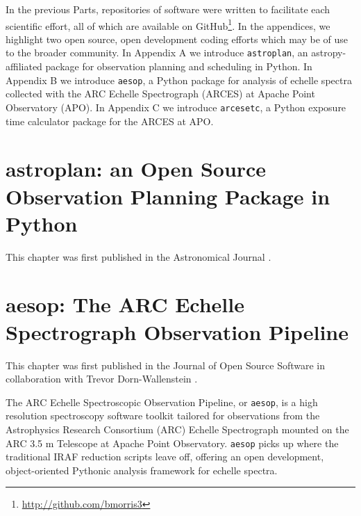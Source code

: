 \documentclass[12pt, twoside]{uwthesis}
\begin{document}


\printendnotes

%
%



%
%
\appendix
\raggedbottom\sloppy

\pagebreak
In the previous Parts, repositories of software were written to facilitate each scientific effort, all of which are available on GitHub\footnote{\url{http://github.com/bmorris3}}. In the appendices, we highlight two open source, open development coding efforts which may be of use to the broader community. In Appendix A we introduce {\tt astroplan}, an astropy-affiliated package for observation planning and scheduling in Python. In Appendix B we introduce {\tt aesop}, a Python package for analysis of echelle spectra collected with the ARC Echelle Spectrograph (ARCES) at Apache Point Observatory (APO). In Appendix C we introduce {\tt arcesetc}, a Python exposure time calculator package for the ARCES at APO.  

\chapter{astroplan: an Open Source Observation Planning Package in Python} \label{chap:astroplan}

This chapter was first published in the Astronomical Journal \citep{astroplan}.



\chapter{aesop: The ARC Echelle Spectrograph Observation Pipeline} \label{chap:aesop}

This chapter was first published in the Journal of Open Source Software in collaboration with Trevor Dorn-Wallenstein \citep{aesop}.

The ARC Echelle Spectroscopic Observation Pipeline, or {\tt aesop}, is a high resolution spectroscopy software toolkit tailored for observations from the Astrophysics Research Consortium (ARC) Echelle Spectrograph mounted on the ARC 3.5 m Telescope at Apache Point Observatory. {\tt aesop} picks up where the traditional IRAF reduction scripts leave off, offering an open development, object-oriented Pythonic analysis framework for echelle spectra.
\end{document}
